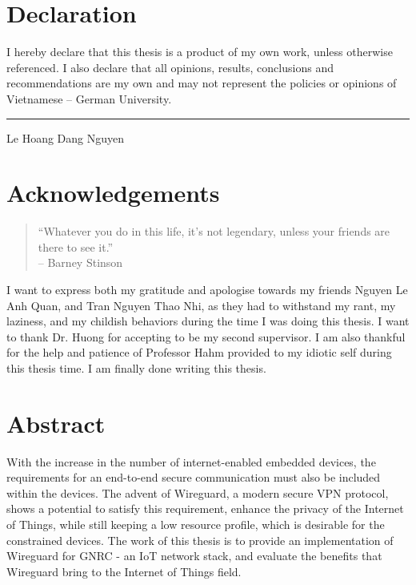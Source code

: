 \documentclass[12pt,twoside]{report}
\begin{document}
\section *{\centering Declaration}
\doublespacing
\large I hereby declare that this thesis is a product of my own work, unless
otherwise referenced. I also declare that all opinions, results, conclusions
and recommendations are my own and may not represent the policies or
opinions of Vietnamese – German University.

\vspace{12cm}  %

\noindent\hfill\rule{8cm}{0.4pt}  %
\vspace{0.5cm} %

\noindent\hspace{8cm} Le Hoang Dang Nguyen %
\newpage

\thispagestyle{empty}
\section *{\centering Acknowledgements}
\begin{quote}
  ``Whatever you do in this life, it's not legendary, unless your friends are there to see it.'' \\
  -- Barney Stinson
\end{quote}
I want to express both my gratitude and apologise towards my friends Nguyen Le Anh Quan, and Tran Nguyen Thao Nhi, as they
had to withstand my rant, my laziness, and my childish behaviors during the time I was doing this thesis. I want to thank
Dr. Huong for accepting to be my second supervisor. I am also thankful for the help and patience of Professor Hahm
provided to my idiotic self during this thesis time. I am finally done writing this thesis.
\newpage

\thispagestyle{empty}
\section*{\centering Abstract}
With the increase in the number of internet-enabled embedded devices, the requirements for
an end-to-end secure communication must also be included within the devices. The advent of 
Wireguard, a modern secure VPN protocol, shows a potential to satisfy this requirement, 
enhance the privacy of the Internet of Things, while still keeping a low resource profile, which
is desirable for the constrained devices. The work of this thesis is to provide an implementation
of Wireguard for GNRC - an IoT network stack, and evaluate the benefits that Wireguard bring 
to the Internet of Things field.
\end{document}

